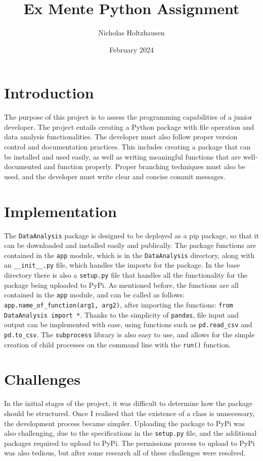\documentclass[12pt]{article}
\title{Ex Mente Python Assignment}
\author{Nicholas Holtzhausen}
\date{February 2024}
\begin{document}
\maketitle

\section{Introduction}
The purpose of this project is to assess the programming capabilities of a
junior developer. The project entails creating a Python package with file
operation and data analysis functionalities. The developer must also follow
proper version control and documentation practices. This includes creating a
package that can be installed and used easily, as well as writing meaningful
functions that are well-documented and function properly. Proper branching
techniques must also be used, and the developer must write clear and concise
commit messages.

\section{Implementation}
The \verb|DataAnalysis| package is designed to be deployed as a pip package, so
that it can be downloaded and installed easily and publically. The package
functions are contained in the \verb|app| module, which is in the
\verb|DataAnalysis| directory, along with an \verb|__init__.py| file, which
handles the imports for the package. In the base directory there is also a
\verb|setup.py| file that handles all the functionality for the package being
uploaded to PyPi.\newline\newline
As mentioned before, the functions are all contained in the \verb|app| module,
and can be called as follows: \verb|app.name_of_function(arg1, arg2)|, after
importing the functions: \verb|from DataAnalysis import *|.\newline\newline
Thanks to the simplicity of \verb|pandas|, file input and output can be
implemented with ease, using functions such as \verb|pd.read_csv| and
\verb|pd.to_csv|. The \verb|subprocess| library is also easy to use, and allows
for the simple creation of child processes on the command line with the
\verb|run()| function.

\section{Challenges}
In the initial stages of the project, it was difficult to determine how the
package should be structured. Once I realised that the existence of a class is
unnecessary, the development process became simpler.\newline\newline
Uploading the package to PyPi was also challenging, due to the specifications
in the \verb|setup.py| file, and the additional packages required to upload to
PyPi. The permissions process to upload to PyPi was also tedious, but after some
research all of these challenges were resolved.
\end{document}
